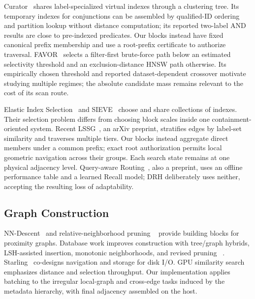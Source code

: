 Curator~\cite{jin2026curator} shares label-specialized virtual indexes through
a clustering tree. Its temporary indexes for conjunctions can be assembled by
qualified-ID ordering and partition lookup without distance computation; its
reported two-label AND results are close to pre-indexed predicates. Our
blocks instead have fixed canonical prefix membership and use a root-prefix
certificate to authorize traversal. FAVOR~\cite{song2026favor} selects a filter-first
brute-force path below an estimated selectivity threshold and an
exclusion-distance HNSW path otherwise. Its empirically chosen threshold and
reported dataset-dependent crossover motivate studying multiple regimes;
the absolute candidate mass remains relevant to the cost of its scan route.

Elastic Index Selection~\cite{yang2025elastic} and SIEVE~\cite{li2025sieve}
choose and share collections of indexes. Their selection problem differs from
choosing block scales inside one containment-oriented system. Recent
LSSG~\cite{wang2026lssg}, an arXiv preprint, stratifies edges by label-set
similarity and traverses multiple tiers. Our blocks instead aggregate direct members under a common prefix; exact
root authorization permits local geometric navigation across their groups.
Each search state remains at one physical adjacency level. Query-aware Routing~\cite{xiong2026routing}, also
a preprint, uses an offline performance table and a learned Recall model;
DRH deliberately uses neither, accepting the resulting loss of adaptability.

\subsection{Graph Construction}
NN-Descent~\cite{dong2011nndescent} and relative-neighborhood pruning
~\cite{toussaint1980rng} provide building blocks for proximity graphs.
Database work improves construction with tree/graph hybrids, LSH-assisted
insertion, monotonic neighborhoods, and revised pruning
~\cite{azizi2023elpis,zhao2023lshapg,peng2023taumng,yang2025pgbuild}.
Starling~\cite{wang2024starling} co-designs navigation and storage for disk
I/O. GPU similarity search~\cite{johnson2021gpu} emphasizes distance and
selection throughput. Our implementation applies batching to the irregular local-graph and
cross-edge tasks induced by the metadata hierarchy, with final adjacency
assembled on the host.

